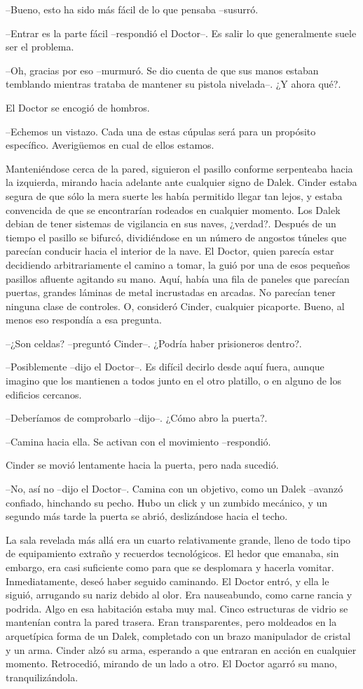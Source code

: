 --Bueno, esto ha sido más fácil de lo que pensaba --susurró.

--Entrar es la parte fácil --respondió el Doctor--. Es salir lo que generalmente suele ser el problema.

--Oh, gracias por eso --murmuró. Se dio cuenta de que sus manos estaban temblando mientras trataba de mantener su pistola nivelada--. ¿Y ahora qué?.

El Doctor se encogió de hombros. 

--Echemos un vistazo. Cada una de estas cúpulas será para un propósito específico. Averigüemos en cual de ellos estamos.

Manteniéndose cerca de la pared, siguieron el pasillo conforme serpenteaba hacia la izquierda, mirando hacia adelante ante cualquier signo de Dalek. Cinder estaba segura de que sólo la mera suerte les había permitido llegar tan lejos, y estaba convencida de que se encontrarían rodeados en cualquier momento. Los Dalek debian de tener sistemas de vigilancia en sus naves, ¿verdad?.
Después de un tiempo el pasillo se bifurcó, dividiéndose en un número de angostos túneles que parecían conducir hacia el interior de la nave. El Doctor, quien parecía estar decidiendo arbitrariamente el camino a tomar, la guió por una de esos pequeños pasillos afluente agitando su mano.
Aquí, había una fila de paneles que parecían puertas, grandes láminas de metal incrustadas en arcadas. No parecían tener ninguna clase de controles. O, consideró Cinder, cualquier picaporte. Bueno, al menos eso respondía a esa pregunta.

--¿Son celdas? --preguntó Cinder--. ¿Podría haber prisioneros dentro?. 

--Posiblemente --dijo el Doctor--. Es difícil decirlo desde aquí fuera, aunque imagino que los mantienen a todos junto en el otro platillo, o en alguno de los edificios cercanos.

--Deberíamos de comprobarlo --dijo--. ¿Cómo abro la puerta?.

--Camina hacia ella. Se activan con el movimiento --respondió.

Cinder se movió lentamente hacia la puerta, pero nada sucedió.

--No, así no --dijo el Doctor--. Camina con un objetivo, como un Dalek --avanzó confiado, hinchando su pecho. Hubo un click y un zumbido mecánico, y un segundo más tarde la puerta se abrió, deslizándose hacia el techo.

La sala revelada más allá era un cuarto relativamente grande, lleno de todo tipo de equipamiento extraño y recuerdos tecnológicos. El hedor que emanaba, sin embargo, era casi suficiente como  para que se desplomara y hacerla vomitar. Inmediatamente, deseó haber seguido caminando.
El Doctor entró, y ella le siguió, arrugando su nariz debido al olor. Era nauseabundo, como carne rancia y podrida. Algo en esa habitación estaba muy mal.
Cinco estructuras de vidrio se mantenían contra la pared trasera. Eran transparentes, pero moldeados en la arquetípica forma de un Dalek, completado con un brazo manipulador de cristal y un arma.
Cinder alzó su arma, esperando a que entraran en acción en cualquier momento. Retrocedió, mirando de un lado a otro.
El Doctor agarró su mano, tranquilizándola. 

